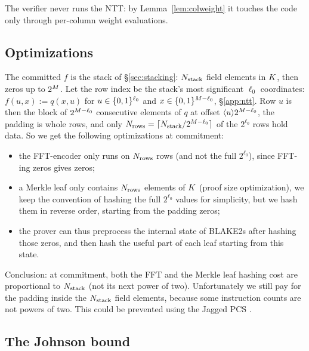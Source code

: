 The verifier never runs the NTT: by Lemma~\ref{lem:colweight} it touches the code only through per-column weight evaluations.

\subsection{Optimizations}\label{sec:pcs-opt}

The committed $f$ is the stack of \S\ref{sec:stacking}: $N_{\mathrm{stack}}$ field elements in $K$, then zeros up to $2^{M}$. Let the row index be the stack's most significant $\ell_0$ coordinates: $f(u, x) := q(x, u)$ for $u \in \{0,1\}^{\ell_0}$ and $x \in \{0,1\}^{M - \ell_0}$, \S\ref{app:ntt}. Row $u$ is then the block of $2^{M - \ell_0}$ consecutive elements of $q$ at offset $\langle u \rangle 2^{M - \ell_0}$, the padding is whole rows, and only $N_{\mathrm{rows}}=\lceil N_{\mathrm{stack}}/2^{M-\ell_0}\rceil$ of the $2^{\ell_0}$ rows hold data. So we get the following optimizations at commitment:
\begin{itemize}[itemsep=1pt,topsep=2pt]
\item the FFT-encoder only runs on $N_{\mathrm{rows}}$ rows (and not the full $2^{\ell_0}$), since FFT-ing zeros gives zeros;
\item a Merkle leaf only contains $N_{\mathrm{rows}}$ elements of $K$ (proof size optimization), we keep the convention of hashing the full $2^{\ell_0}$ values for simplicity, but we hash them in reverse order, starting from the padding zeros;
\item the prover can thus preprocess the internal state of BLAKE2s after hashing those zeros, and then hash the useful part of each leaf starting from this state.
\end{itemize}

Conclusion: at commitment, both the FFT and the Merkle leaf hashing cost are proportional to $N_{\mathrm{stack}}$ (not its next power of two). Unfortunately we still pay for the padding inside the $N_{\mathrm{stack}}$ field elements, because some instruction counts are not powers of two. This could be prevented using the Jagged PCS \cite{jagged_pcs}.


\subsection{The Johnson bound}\label{app:johnson}

